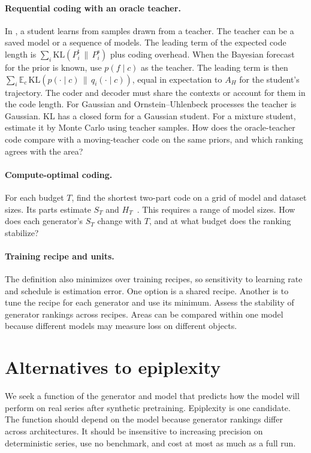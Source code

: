 \documentclass[11pt]{article}
\begin{document}
\paragraph{Requential coding with an oracle teacher.} In \citet{qiu2026},
a student learns from samples drawn from a teacher. The teacher can be
a saved model or a sequence of models. The leading term of the expected
code length is $\sum_i\mathrm{KL}(P^{\mathrm{t}}_i\,\|\,P^{\mathrm{s}}_i)$
plus coding overhead.
When the Bayesian forecast for the prior is known, use $p(f\mid c)$ as the
teacher. The leading term is then $\sum_i\mathbb{E}_c\,
\mathrm{KL}(p(\cdot\mid c)\,\|\,q_i(\cdot\mid c))$, equal in expectation
to $A_H$ for the student's trajectory. The coder and decoder must share
the contexts or account for them in the code length.
For Gaussian and Ornstein--Uhlenbeck processes the teacher is Gaussian.
KL has a closed form for a Gaussian student. For a mixture student, estimate
it by Monte Carlo using teacher samples. How does the oracle-teacher code
compare with a moving-teacher code on the same priors, and which ranking
agrees with the area?

\paragraph{Compute-optimal coding.} For each budget $T$, find the shortest
two-part code on a grid of model and dataset sizes. Its parts estimate
$S_T$ and $H_T$~\citep{finzi2026}. This requires a range of model sizes.
How does each generator's $S_T$ change with $T$, and at what budget does
the ranking stabilize?

\paragraph{Training recipe and units.} The definition also minimizes over
training recipes, so sensitivity to learning rate and schedule is estimation
error. One option is a shared recipe. Another is to tune the recipe for
each generator and use its minimum. Assess the stability of generator
rankings across recipes. Areas can be compared within one model because
different models may measure loss on different objects.

\section{Alternatives to epiplexity}\label{sec:alternatives}

We seek a function of the generator and model that predicts how the model
will perform on real series after synthetic pretraining. Epiplexity is one
candidate. The function should depend on the model because generator
rankings differ across architectures. It should be insensitive to increasing
precision on deterministic series, use no benchmark, and cost at most as
much as a full run.
\end{document}
